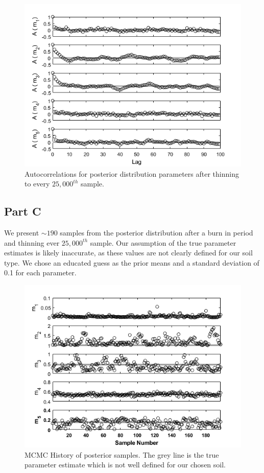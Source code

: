 \documentclass{article}
\begin{document}
\begin{figure}[!h]
    \centering
    \includegraphics[width=\textwidth]{2b.png}
    \caption{Autocorrelations for posterior distribution parameters after thinning to every $25,000^{th}$ sample.}
    \label{fig:2b}
\end{figure}
\FloatBarrier

\subsection*{Part C}
We present $\sim190$ samples from the posterior distribution after a burn in period and thinning ever $25,000^{th}$ sample. Our assumption of the true parameter estimates is likely inaccurate, as these values are not clearly defined for our soil type. We chose an educated guess as the prior means and a standard deviation of 0.1 for each parameter.

\begin{figure}[!h]
    \centering
    \includegraphics[width=\textwidth]{2c.png}
    \caption{MCMC History of posterior samples. The grey line is the  true parameter estimate which is not well defined for our chosen soil.}
    \label{fig:2c}
\end{figure}
\FloatBarrier
\end{document}
